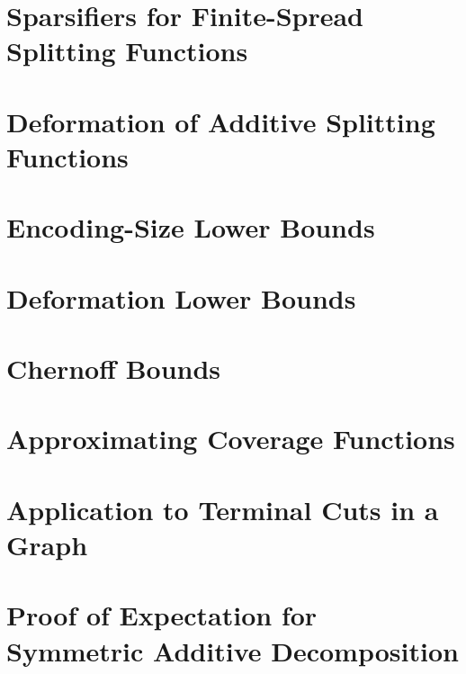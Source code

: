 \documentclass[11pt]{article}
\begin{document}
\section{Sparsifiers for Finite-Spread Splitting Functions}
\label{sec:finite-spread-sparsifiers-proof}


\section{Deformation of Additive Splitting Functions}
\label{sec:deformation-additive-splitting}


\section{Encoding-Size Lower Bounds}
\label{sec:encoding-size-lower-bounds}


\section{Deformation Lower Bounds}
\label{sec:deformation-lower-bounds}



%
{\small
  
  
} %
\appendix

\section{Chernoff Bounds}
\label{sec:preliminaries}


\section{Approximating Coverage Functions}
\label{appendix:coverage}


\section{Application to Terminal Cuts in a Graph}
\label{appendix:terminal-cut-functions}


\section{Proof of Expectation for Symmetric Additive Decomposition}
\label{appendix:proof-symmetric-additive}


    
\end{document}

